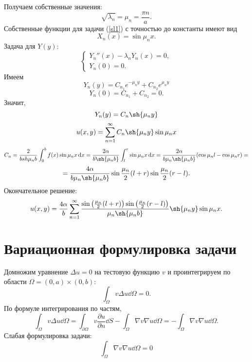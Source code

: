 Получаем собственные значения:
\begin{equation*}
	\sqrt{\lambda_n}=\mu_n=\frac{\pi n}{a} .
\end{equation*}
Собственные функции для задачи (\ref{sl1}) с точностью до константы имеют вид
\begin{equation*}
	X_n(x)=\sin{\mu_n x}.
\end{equation*}
Задача для $Y(y)$:
\begin{equation}\label{sl2}
	\begin{cases}
		Y_n''(x)-\lambda_n Y_n(x)=0,\\
		Y_n(0)=0.
	\end{cases}
\end{equation}
Имеем
\begin{equation}
	Y_n(y)=C_{n_1}e^{-\mu_n  y}+C_{n_2}e^{\mu_n  y}
\end{equation}
\begin{equation*}
	Y_n(0)=C_{n_1} + C_{n_2} = 0.
\end{equation*}
Значит,
\begin{equation}
	Y_n(y)=C_n \sh{\mu_n y}
\end{equation}
\begin{equation}
	u(x,y) = \sum_{n=1}^{\infty}C_n \sh{\mu_n y} \sin{\mu_n x}
\end{equation}
\begin{equation*}
	C_n = \frac{2}{b sh{\mu_n b}}\int_0^b f(x) \sin{\mu_n x} \dd{x} = \frac{2\alpha}{b\sh{\mu_n b}}\int_l^r\sin{\mu_nx}\dd{x} =  \frac{2\alpha}{b\mu_n\sh{\mu_n b}}(\cos{\mu_n l} - \cos{\mu_n r})=
\end{equation*}
\begin{equation}
	=\frac{4\alpha}{b\mu_n\sh{\mu_n b}}\sin{\frac{\mu_n}{2}(l+r)}\sin{\frac{\mu_n}{2}(r-l)}.
\end{equation}
Окончательное решение:
\begin{equation}
	u(x,y)=\frac{4\alpha}{b}\sum_{n=1}^{\infty}\frac{\sin{\left(\frac{\mu_n}{2}(l+r)\right)}\sin{\left(\frac{\mu_n}{2}(r-l)\right)}}{\mu_n\sh{\mu_n b}}\sh{\mu_n y} \sin{\mu_n x}.
\end{equation}

\section{Вариационная формулировка задачи}
Домножим уравнение $\Delta u = 0$ на тестовую функцию $v$ и проинтегрируем по области $\Omega = (0,a)\times(0,b)$:
\begin{equation}
	\int_{\Omega}v \Delta u \dd{\Omega}=0.
\end{equation}
По формуле интегрирования по частям,
\begin{equation}
	\int_{\Omega}v \Delta u \dd{\Omega}=\int_{\partial \Omega}v\frac{\partial u}{\partial n}\dd{S}-\int_{\Omega}\nabla v\nabla u \dd{\Omega}=-\int_{\Omega}\nabla v \nabla u \dd{\Omega}.
\end{equation}
Слабая формулировка задачи:
\begin{equation}\label{weak_form}
	\int_{\Omega} \nabla v \nabla u \dd{\Omega}=0
\end{equation}

